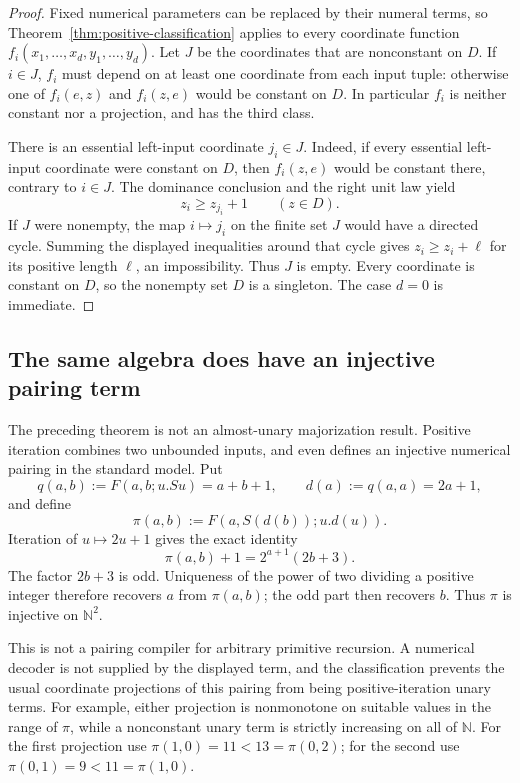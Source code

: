 \begin{proof}
Fixed numerical parameters can be replaced by their numeral terms, so
Theorem~\ref{thm:positive-classification} applies to every coordinate
function $f_i(x_1,\ldots,x_d,y_1,\ldots,y_d)$.
Let $J$ be the coordinates that are nonconstant on $D$. If $i\in J$,
$f_i$ must depend on at least one coordinate from each input tuple:
otherwise one of $f_i(e,z)$ and $f_i(z,e)$ would be constant on $D$.
In particular $f_i$ is neither constant nor a projection, and has the
third class.

There is an essential left-input coordinate $j_i\in J$. Indeed, if
every essential left-input coordinate were constant on $D$, then
$f_i(z,e)$ would be constant there, contrary to $i\in J$.
The dominance conclusion and the right unit law yield
\[
                              z_i\geq z_{j_i}+1
                              \qquad(z\in D).
\]
If $J$ were nonempty, the map $i\mapsto j_i$ on the finite set $J$
would have a directed cycle. Summing the displayed inequalities around
that cycle gives $z_i\geq z_i+\ell$ for its positive length $\ell$,
an impossibility. Thus $J$ is empty. Every coordinate is constant on
$D$, so the nonempty set $D$ is a singleton. The case $d=0$ is immediate.
\end{proof}

\subsection{The same algebra does have an injective pairing term}

The preceding theorem is not an almost-unary majorization result.
Positive iteration combines two unbounded inputs, and even defines an
injective numerical pairing in the standard model.
Put
\[
 q(a,b):=F(a,b;u.Su)=a+b+1,\qquad
 d(a):=q(a,a)=2a+1,
\]
and define
\[
             \pi(a,b):=F(a,S(d(b));u.d(u)).
\]
Iteration of $u\mapsto2u+1$ gives the exact identity
\[
             \pi(a,b)+1=2^{a+1}(2b+3).
\]
The factor $2b+3$ is odd. Uniqueness of the power of two dividing a
positive integer therefore recovers $a$ from $\pi(a,b)$; the odd part
then recovers $b$. Thus $\pi$ is injective on $\mathbb N^2$.

This is not a pairing compiler for arbitrary primitive recursion. A
numerical decoder is not supplied by the displayed term, and the
classification prevents the usual coordinate projections of this pairing
from being positive-iteration unary terms. For example, either projection
is nonmonotone on suitable values in the range of $\pi$, while a
nonconstant unary term is strictly increasing on all of $\mathbb N$.
For the first projection use $\pi(1,0)=11<13=\pi(0,2)$;
for the second use $\pi(0,1)=9<11=\pi(1,0)$.

